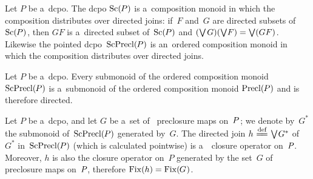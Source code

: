 \documentclass[11pt,letterpaper]{article}
\renewcommand{\thmskip}{\bigskip}
\renewcommand{\interskip}{\medskip}
\begin{document}
\thmskip

\begin{corollary}\label{cor:dcpo-P==>compos-monoids-Sc(P)-and-ScPreCl(P)}
Let\/ $P$ be a~dcpo.
The dcpo\/ $\mathop{\smash{\mathrm{Sc}}}\nolimits(\mspace{-1mu} P)$ is a~composition monoid
	in which the composition distributes over directed joins:
if\/~$F$ and\/~$G$ are directed subsets of\/~$\mathop{\smash{\mathrm{Sc}}}\nolimits(\mspace{-1mu} P)\mspace{1mu}$,
then\/ $GF$ is a~directed subset of\/~$\mathop{\smash{\mathrm{Sc}}}\nolimits(\mspace{-1mu} P)$ and
	$(\mathop{\textstyle\bigvee}\nolimits\mspace{-1mu} G)(\mathop{\textstyle\bigvee}\nolimits\!F) = \mathop{\textstyle\bigvee}\nolimits(GF)\mspace{1mu}$.
Likewise the pointed dcpo\/~$\mathop{\smash{\mathrm{ScPrecl}}}\nolimits(\mspace{-1mu} P)$ is an~ordered composition monoid
	in which the composition distributes over directed joins.
\end{corollary}

\thmskip

Let $P$ be a~dcpo.
Every submonoid of the ordered composition monoid $\mathop{\smash{\mathrm{ScPrecl}}}\nolimits(\mspace{-1mu} P)$
	is a~submonoid of the ordered composition monoid $\mathop{\smash{\mathrm{Precl}}}\nolimits(\mspace{-1mu} P)$
and is therefore directed.

\thmskip

\begin{theorem}\label{thm:in-dcpo-Scottcont-preclmaps-gener-Scottcont-clop}
Let\/ $P$ be a~dcpo,
and let\/ $G$ be a~set of \Scottcont\ preclosure maps on\/~$P\mspace{1mu}$;
we denote by\/~$G^*$ the submonoid of\/~$\mathop{\smash{\mathrm{ScPrecl}}}\nolimits(\mspace{-1mu} P)$ generated by\/~$G$.
The directed join\/ $h\mathrel{\overset{\text{def}}{\mspace{1mu}=\!=\mspace{1mu}}}\mathop{\textstyle\bigvee}\nolimits\mspace{-2mu} G^*$ of\/~$G^*$ in\/~$\mathop{\smash{\mathrm{ScPrecl}}}\nolimits(\mspace{-1mu} P)$
	{\rm(}which is calculated pointwise\/{\rm)}
is a~\Scottcont\ closure operator on\/~$P\mspace{-1mu}$.
Moreover, $h$ is also the closure operator on\/~$P$
	generated by the set\/~$G$ of preclosure maps on\/~$P\mspace{-1mu}$,
therefore\/ $\mathop{\smash{\mathrm{Fix}}}\nolimits(h) = \mathop{\smash{\mathrm{Fix}}}\nolimits(\mspace{-1mu} G\mspace{1mu})\mspace{1mu}$.
\end{theorem}

\interskip
\end{document}
